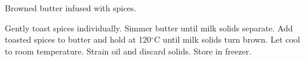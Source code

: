 \documentclass[main]{subfiles}
\begin{document}
Browned butter infused with spices.

\begin{rec}
Gently toast spices individually.
Simmer butter until milk solids separate.
Add toasted spices to butter and hold at 120$^\circ$C until milk solids turn brown.
Let cool to room temperature.
\newstep
Strain oil and discard solids. Store in freezer.
\end{rec}
\end{document}
